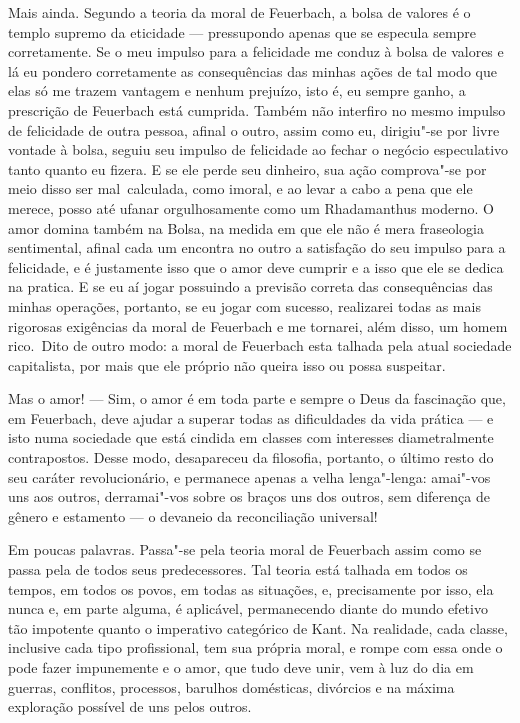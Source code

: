 Mais ainda. Segundo a teoria da moral
de Feuerbach,
a bolsa de valores é o templo supremo da eticidade --- 
pressupondo apenas que se especula sempre corretamente. Se o meu impulso
para a felicidade me conduz à bolsa de valores e lá eu pondero
corretamente as consequências das minhas ações de tal modo que elas só
me trazem vantagem e nenhum prejuízo, isto é, eu sempre ganho, a
prescrição
de Feuerbach está
cumprida. Também não interfiro no mesmo impulso de felicidade de outra
pessoa, afinal o outro, assim como eu, dirigiu"-se por livre vontade à
bolsa, seguiu seu impulso de felicidade ao fechar o negócio especulativo
tanto quanto eu fizera. E se ele perde seu dinheiro, sua ação
comprova"-se por meio disso ser mal\est\ calculada, como imoral,
e ao levar a cabo a pena que ele merece, posso até
ufanar orgulhosamente como um Rhadamanthus moderno. O amor domina também
na Bolsa, na medida em que ele não é mera fraseologia sentimental,
afinal cada um encontra no outro a satisfação do seu impulso para a
felicidade, e é justamente isso que o amor deve cumprir e a isso que ele
se dedica na pratica. E se eu aí jogar possuindo a previsão correta das
consequências das minhas operações, portanto, se eu jogar com sucesso,
realizarei todas as mais rigorosas exigências da moral
de Feuerbach e
me tornarei, além disso, um homem rico. \textbar{}\,Dito de outro modo: a moral
de Feuerbach esta
talhada pela atual sociedade capitalista, por mais que ele próprio não
queira isso ou possa suspeitar.\,\textbar{}

Mas o amor! --- Sim, o amor é em toda parte e sempre o Deus da fascinação
que,
em Feuerbach,
deve ajudar a superar todas as dificuldades da vida prática --- e isto
numa sociedade que está cindida em classes com interesses diametralmente
contrapostos. Desse modo, desapareceu da filosofia, portanto, o último
resto do seu caráter revolucionário, e permanece apenas a velha
lenga"-lenga: amai"-vos uns aos outros, derramai"-vos sobre os braços uns
dos outros, sem diferença de gênero e estamento --- o devaneio da
reconciliação universal!

Em poucas palavras. Passa"-se pela teoria moral
de Feuerbach
assim como se passa pela de todos seus predecessores. Tal teoria está
talhada em todos os tempos, em todos os povos, em todas as situações, e,
precisamente por isso, ela nunca e, em parte alguma, é aplicável,
permanecendo diante do mundo efetivo tão impotente quanto o imperativo
categórico
de Kant.
Na realidade, cada classe, inclusive cada tipo profissional, tem sua
própria moral, e rompe com essa onde o pode fazer impunemente e o amor,
que tudo deve unir, vem à luz do dia em guerras, conflitos, processos,
barulhos domésticas, divórcios e na máxima exploração possível de uns
pelos outros.


